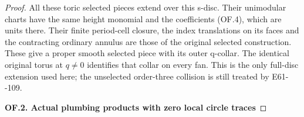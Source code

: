\begin{proof}
All these toric selected pieces extend over this s-disc. Their
unimodular charts have the same height monomial and the coefficients
(OF.4), which are units there. Their finite period-cell closure,
the index translations on its faces and the contracting ordinary
annulus are those of the original selected construction. These
give a proper smooth selected piece with its outer q-collar.
The identical original torus at \(q\ne0\) identifies that collar
on every fan. This is the only full-disc extension used here; the
unselected order-three collision is still treated by E61-\/-109.

\par

\medskip\noindent\textbf{OF.2. Actual plumbing products with zero local circle traces}

\par\nobreak


\end{proof}
